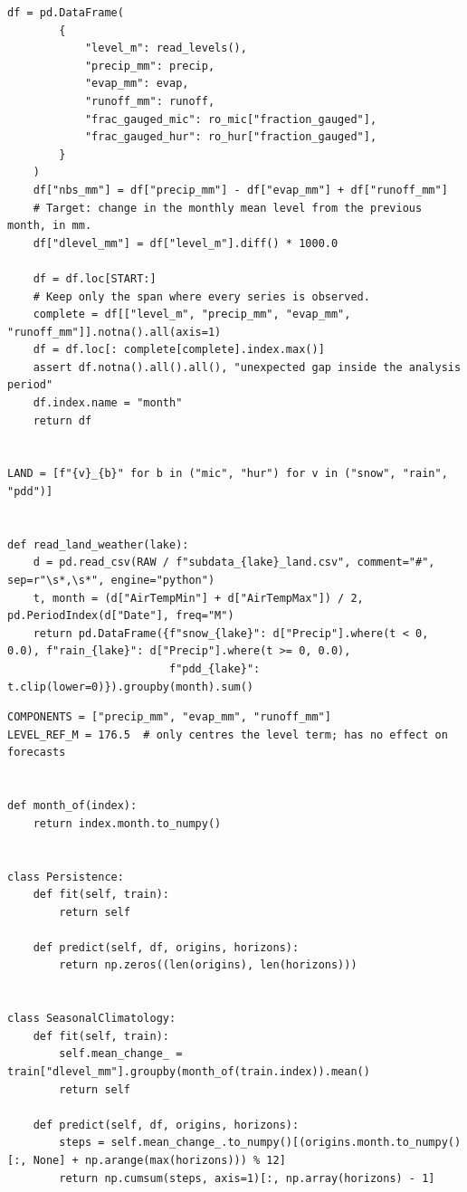 \documentclass{article}
\begin{document}
\begin{lstlisting}[caption={Imports, data loading and the merged monthly table}]
    df = pd.DataFrame(
        {
            "level_m": read_levels(),
            "precip_mm": precip,
            "evap_mm": evap,
            "runoff_mm": runoff,
            "frac_gauged_mic": ro_mic["fraction_gauged"],
            "frac_gauged_hur": ro_hur["fraction_gauged"],
        }
    )
    df["nbs_mm"] = df["precip_mm"] - df["evap_mm"] + df["runoff_mm"]
    # Target: change in the monthly mean level from the previous month, in mm.
    df["dlevel_mm"] = df["level_m"].diff() * 1000.0

    df = df.loc[START:]
    # Keep only the span where every series is observed.
    complete = df[["level_m", "precip_mm", "evap_mm", "runoff_mm"]].notna().all(axis=1)
    df = df.loc[: complete[complete].index.max()]
    assert df.notna().all().all(), "unexpected gap inside the analysis period"
    df.index.name = "month"
    return df


LAND = [f"{v}_{b}" for b in ("mic", "hur") for v in ("snow", "rain", "pdd")]


def read_land_weather(lake):
    d = pd.read_csv(RAW / f"subdata_{lake}_land.csv", comment="#", sep=r"\s*,\s*", engine="python")
    t, month = (d["AirTempMin"] + d["AirTempMax"]) / 2, pd.PeriodIndex(d["Date"], freq="M")
    return pd.DataFrame({f"snow_{lake}": d["Precip"].where(t < 0, 0.0), f"rain_{lake}": d["Precip"].where(t >= 0, 0.0),
                         f"pdd_{lake}": t.clip(lower=0)}).groupby(month).sum()
\end{lstlisting}

\begin{lstlisting}[caption={Baseline models: persistence and seasonal climatology}]
COMPONENTS = ["precip_mm", "evap_mm", "runoff_mm"]
LEVEL_REF_M = 176.5  # only centres the level term; has no effect on forecasts


def month_of(index):
    return index.month.to_numpy()


class Persistence:
    def fit(self, train):
        return self

    def predict(self, df, origins, horizons):
        return np.zeros((len(origins), len(horizons)))


class SeasonalClimatology:
    def fit(self, train):
        self.mean_change_ = train["dlevel_mm"].groupby(month_of(train.index)).mean()
        return self

    def predict(self, df, origins, horizons):
        steps = self.mean_change_.to_numpy()[(origins.month.to_numpy()[:, None] + np.arange(max(horizons))) % 12]
        return np.cumsum(steps, axis=1)[:, np.array(horizons) - 1]
\end{lstlisting}
\end{document}
